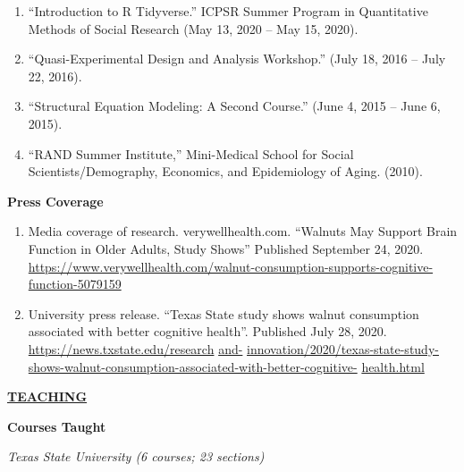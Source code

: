 \documentclass[
]{article}
\begin{document}
\begin{enumerate}
\def\labelenumi{\arabic{enumi}.}
\item
  ``Introduction to R Tidyverse.'' ICPSR Summer Program in Quantitative
  Methods of Social Research (May 13, 2020 -- May 15, 2020).
\item
  ``Quasi-Experimental Design and Analysis Workshop.'' (July 18, 2016 --
  July 22, 2016).
\item
  ``Structural Equation Modeling: A Second Course.'' (June 4, 2015 --
  June 6, 2015).
\item
  ``RAND Summer Institute,'' Mini-Medical School for Social
  Scientists/Demography, Economics, and Epidemiology of Aging. (2010).
\end{enumerate}

\textbf{Press Coverage}

\begin{enumerate}
\def\labelenumi{\arabic{enumi}.}
\item
  Media coverage of research. verywellhealth.com. ``Walnuts May Support
  Brain Function in Older Adults, Study Shows'' Published September 24,
  2020.
  \url{https://www.verywellhealth.com/walnut-consumption-supports-cognitive-function-5079159}
\item
  University press release. ``Texas State study shows walnut consumption
  associated with better cognitive health''. Published July 28, 2020.
  \href{https://news.txstate.edu/research-and-innovation/2020/texas-state-study-shows-walnut-consumption-associated-with-better-cognitive-health.html}{https://news.txstate.edu/research}
  \href{https://news.txstate.edu/research-and-innovation/2020/texas-state-study-shows-walnut-consumption-associated-with-better-cognitive-health.html}{and-}
  \href{https://news.txstate.edu/research-and-innovation/2020/texas-state-study-shows-walnut-consumption-associated-with-better-cognitive-health.html}{innovation/2020/texas-state-study-shows-walnut-consumption-associated-with-better-cognitive-}
  \href{https://news.txstate.edu/research-and-innovation/2020/texas-state-study-shows-walnut-consumption-associated-with-better-cognitive-health.html}{health.html}
\end{enumerate}

\uline{\textbf{TEACHING}}

\textbf{Courses Taught}

\emph{Texas State University (6 courses; 23 sections)}
\end{document}
